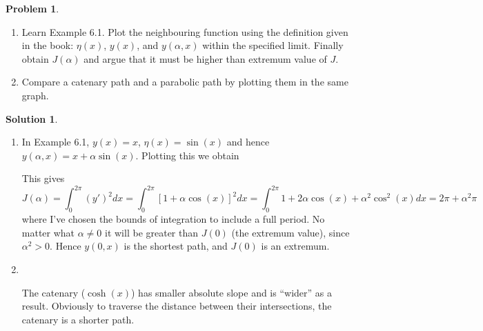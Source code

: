 \documentclass[10pt]{article}
\theoremstyle{definition}
\newtheorem{problem}{Problem}
\newtheorem{soln}{Solution}
\begin{document}
\begin{problem}~
\begin{enumerate}[label=(\alph*)]
  \item Learn Example 6.1. Plot the neighbouring function using the definition given in the book:
        $\eta(x)$, $y(x)$, and $y(\alpha,x)$ within the specified limit. Finally obtain $J(\alpha)$ and argue that it
        must be higher than extremum value of $J$.
  \item Compare a catenary path and a parabolic path by plotting them in the same graph.
\end{enumerate}
\end{problem}
\begin{soln}~
  \begin{enumerate}[label=(\alph*)]
    \item In Example 6.1, $y(x)=x$, $\eta(x)=\sin(x)$ and hence $y(\alpha,x)=x+\alpha\sin(x)$. Plotting this we obtain
          ~\begin{center}
          \end{center}
          This gives
          $$J(\alpha)=\int_0^{2\pi} (y')^2dx=\int_0^{2\pi} \left[1+\alpha\cos(x)\right]^2dx=\int_0^{2\pi} 1+2\alpha\cos(x)+\alpha^2\cos^2(x)dx=2\pi+\alpha^2\pi$$
          where I've chosen the bounds of integration to include a full period. No matter what $\alpha\neq 0$ it will be greater than $J(0)$ (the extremum value),
          since $\alpha^2>0$. Hence $y(0,x)$ is the shortest path, and $J(0)$ is an extremum.
    \item ~\begin{center}
          \end{center}
          The catenary ($\cosh(x)$) has smaller absolute slope and is ``wider'' as a result. Obviously to traverse the distance between their intersections,
          the catenary is a shorter path.
  \end{enumerate}
\end{soln}
\end{document}
